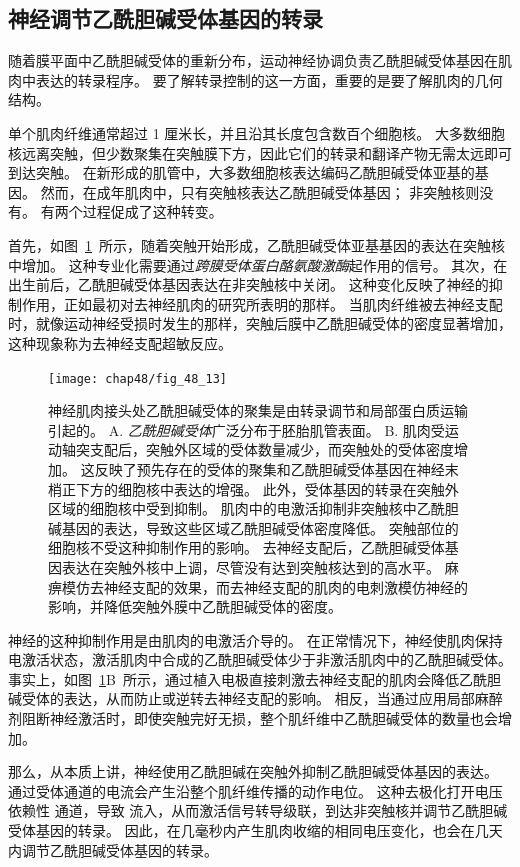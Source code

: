 \subsection{神经调节乙酰胆碱受体基因的转录}

随着膜平面中乙酰胆碱受体的重新分布，运动神经协调负责乙酰胆碱受体基因在肌肉中表达的转录程序。
要了解转录控制的这一方面，重要的是要了解肌肉的几何结构。


单个肌肉纤维通常超过 1 厘米长，并且沿其长度包含数百个细胞核。
大多数细胞核远离突触，但少数聚集在突触膜下方，因此它们的转录和翻译产物无需太远即可到达突触。
在新形成的肌管中，大多数细胞核表达编码乙酰胆碱受体亚基的基因。
然而，在成年肌肉中，只有突触核表达乙酰胆碱受体基因；
非突触核则没有。
有两个过程促成了这种转变。


首先，如图~\ref{fig:48_13}~所示，随着突触开始形成，乙酰胆碱受体亚基基因的表达在突触核中增加。
这种专业化需要通过\textit{跨膜受体蛋白酪氨酸激酶}起作用的信号。
其次，在出生前后，乙酰胆碱受体基因表达在非突触核中关闭。
这种变化反映了神经的抑制作用，正如最初对去神经肌肉的研究所表明的那样。
当肌肉纤维被去神经支配时，就像运动神经受损时发生的那样，突触后膜中乙酰胆碱受体的密度显著增加，这种现象称为去神经支配超敏反应。


\begin{figure}[htbp]
	\centering
	\texttt{[image: chap48/fig\_48\_13]}
	\caption{神经肌肉接头处乙酰胆碱受体的聚集是由转录调节和局部蛋白质运输引起的。
		A. \textit{乙酰胆碱受体}广泛分布于胚胎肌管表面。
		B. 肌肉受运动轴突支配后，突触外区域的受体数量减少，而突触处的受体密度增加。
		这反映了预先存在的受体的聚集和乙酰胆碱受体基因在神经末梢正下方的细胞核中表达的增强。
		此外，受体基因的转录在突触外区域的细胞核中受到抑制。
		肌肉中的电激活抑制非突触核中乙酰胆碱基因的表达，导致这些区域乙酰胆碱受体密度降低。
		突触部位的细胞核不受这种抑制作用的影响。
		去神经支配后，乙酰胆碱受体基因表达在突触外核中上调，尽管没有达到突触核达到的高水平。
		麻痹模仿去神经支配的效果，而去神经支配的肌肉的电刺激模仿神经的影响，并降低突触外膜中乙酰胆碱受体的密度。}
	\label{fig:48_13}
\end{figure}


神经的这种抑制作用是由肌肉的电激活介导的。
在正常情况下，神经使肌肉保持电激活状态，激活肌肉中合成的乙酰胆碱受体少于非激活肌肉中的乙酰胆碱受体。
事实上，如图~\ref{fig:48_13}B~所示，通过植入电极直接刺激去神经支配的肌肉会降低乙酰胆碱受体的表达，从而防止或逆转去神经支配的影响。
相反，当通过应用局部麻醉剂阻断神经激活时，即使突触完好无损，整个肌纤维中乙酰胆碱受体的数量也会增加。


那么，从本质上讲，神经使用乙酰胆碱在突触外抑制乙酰胆碱受体基因的表达。
通过受体通道的电流会产生沿整个肌纤维传播的动作电位。
这种去极化打开电压依赖性  通道，导致  流入，从而激活信号转导级联，到达非突触核并调节乙酰胆碱受体基因的转录。
因此，在几毫秒内产生肌肉收缩的相同电压变化，也会在几天内调节乙酰胆碱受体基因的转录。


